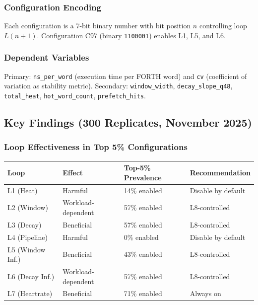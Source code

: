 \subsubsection{Configuration Encoding}

Each configuration is a 7-bit binary number with bit position $n$
controlling loop $L(n+1)$. Configuration C97 (binary \texttt{1100001})
enables L1, L5, and L6.

\subsubsection{Dependent Variables}

Primary: \texttt{ns\_per\_word} (execution time per FORTH word) and
\texttt{cv} (coefficient of variation as stability metric).
Secondary: \texttt{window\_width}, \texttt{decay\_slope\_q48},
\texttt{total\_heat}, \texttt{hot\_word\_count}, \texttt{prefetch\_hits}.

\subsection{Key Findings (300 Replicates, November 2025)}

\subsubsection{Loop Effectiveness in Top 5\% Configurations}

\begin{center}
\begin{tabular}{llll}
\toprule
Loop & Effect & Top-5\% Prevalence & Recommendation \\
\midrule
L1 (Heat)        & Harmful            & 14\% enabled  & Disable by default \\
L2 (Window)      & Workload-dependent & 57\% enabled  & L8-controlled \\
L3 (Decay)       & Beneficial         & 57\% enabled  & L8-controlled \\
L4 (Pipeline)    & Harmful            & 0\% enabled   & Disable by default \\
L5 (Window Inf.) & Beneficial         & 43\% enabled  & L8-controlled \\
L6 (Decay Inf.)  & Workload-dependent & 57\% enabled  & L8-controlled \\
L7 (Heartrate)   & Beneficial         & 71\% enabled  & Always on \\
\bottomrule
\end{tabular}
\end{center}

